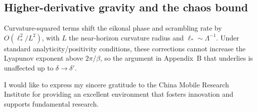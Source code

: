 \documentclass[a4paper,11pt]{article}
\theoremstyle{plain}
\theoremstyle{definition}
\theoremstyle{remark}
\begin{document}
\subsection{Higher-derivative gravity and the chaos bound}
Curvature-squared terms shift the eikonal phase and scrambling rate by $O(\ell_\ast^2/L^2)$, with $L$ the near-horizon curvature radius and $\ell_\ast\sim \Lambda^{-1}$. Under standard analyticity/positivity conditions, these corrections cannot increase the Lyapunov exponent above $2\pi/\beta$, so the argument in Appendix~B that underlies  is unaffected up to $\delta\to\delta'$.



\acknowledgments
 
I would like to express my sincere gratitude to the China Mobile Research Institute for 
providing an excellent environment that fosters innovation and supports fundamental research.




\end{document}
